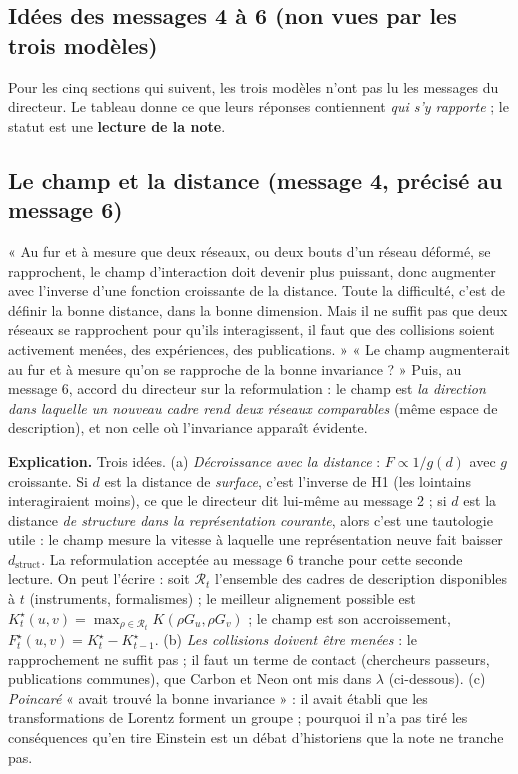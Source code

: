 \documentclass[a4paper,11pt]{article}
\begin{document}
\subsection*{Idées des messages 4 à 6 (non vues par les trois modèles)}
Pour les cinq sections qui suivent, les trois modèles n'ont pas lu les messages du directeur. Le tableau donne ce que leurs réponses contiennent \emph{qui s'y rapporte} ; le statut est une \textbf{lecture de la note}.

\subsection{Le champ et la distance (message 4, précisé au message 6)}\label{sec:champ-distance}
\begin{enonce}
« Au fur et à mesure que deux réseaux, ou deux bouts d'un réseau déformé, se rapprochent, le champ d'interaction doit devenir plus puissant, donc augmenter avec l'inverse d'une fonction croissante de la distance. Toute la difficulté, c'est de définir la bonne distance, dans la bonne dimension. Mais il ne suffit pas que deux réseaux se rapprochent pour qu'ils interagissent, il faut que des collisions soient activement menées, des expériences, des publications. » « Le champ augmenterait au fur et à mesure qu'on se rapproche de la bonne invariance ? » Puis, au message 6, accord du directeur sur la reformulation : le champ est \emph{la direction dans laquelle un nouveau cadre rend deux réseaux comparables} (même espace de description), et non celle où l'invariance apparaît évidente.
\end{enonce}

\textbf{Explication.} Trois idées. (a) \emph{Décroissance avec la distance} : $F\propto 1/g(d)$ avec $g$ croissante. Si $d$ est la distance de \emph{surface}, c'est l'inverse de H1 (les lointains interagiraient moins), ce que le directeur dit lui-même au message 2 ; si $d$ est la distance \emph{de structure dans la représentation courante}, alors c'est une tautologie utile : le champ mesure la vitesse à laquelle une représentation neuve fait baisser $d_{\text{struct}}$. La reformulation acceptée au message 6 tranche pour cette seconde lecture. On peut l'écrire : soit $\mathcal R_t$ l'ensemble des cadres de description disponibles à $t$ (instruments, formalismes) ; le meilleur alignement possible est $K^\star_t(u,v)=\max_{\rho\in\mathcal R_t}K(\rho G_u,\rho G_v)$ ; le champ est son accroissement, $F^\star_t(u,v)=K^\star_t-K^\star_{t-1}$. (b) \emph{Les collisions doivent être menées} : le rapprochement ne suffit pas ; il faut un terme de contact (chercheurs passeurs, publications communes), que Carbon et Neon ont mis dans $\lambda$ (ci-dessous). (c) \emph{Poincaré} « avait trouvé la bonne invariance » : il avait établi que les transformations de Lorentz forment un groupe ; pourquoi il n'a pas tiré les conséquences qu'en tire Einstein est un débat d'historiens que la note ne tranche pas.
\end{document}
